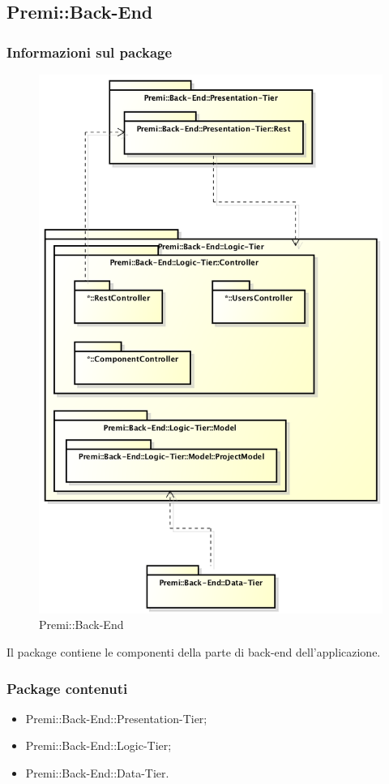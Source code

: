 \subsection{Premi::Back-End}
	\subsubsection*{Informazioni sul package}
		\begin{figure}[h]
			\centering
			\includegraphics[width=0.7\linewidth]{img/back-end_package}
			\caption[Premi::Back-End]{Premi::Back-End}
		\end{figure}
		Il package contiene le componenti della parte di back-end dell'applicazione.
		
	\subsubsection*{Package contenuti}
		\begin{itemize}
			\item Premi::Back-End::Presentation-Tier;
			\item Premi::Back-End::Logic-Tier;
			\item Premi::Back-End::Data-Tier.
		\end{itemize}

